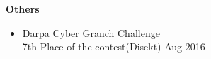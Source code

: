 \documentclass[11pt]{article}
\renewcommand{\section}[1]{\pagebreak[3]%
    \hyphenpenalty=10000%
    \vspace{1.3\baselineskip}%
    \phantomsection\addcontentsline{toc}{section}{#1}%
    \noindent\llap{\scshape\smash{\parbox[t]{\marginparwidth}{\raggedright \large #1}}}%
    \vspace{-\baselineskip}\par}
\newenvironment{innerlist}[1][\enskip\textbullet]%
        {\begin{itemize}[#1,leftmargin=*,parsep=0pt,itemsep=0pt,topsep=0pt,partopsep=0pt]}
        {\end{itemize}}
\newcommand{\halfblankline}{\quad\vspace{-0.5\baselineskip}\pagebreak[3]}
\begin{document}
\textbf{Others}
\begin{innerlist}
\item Darpa Cyber Granch Challenge \\
  7th Place of the contest(Disekt) \hfill Aug 2016
\end{innerlist}





\end{document}
